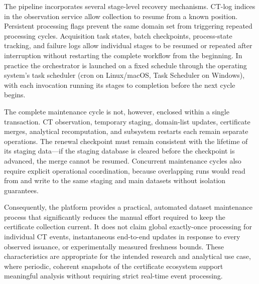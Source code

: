 The pipeline incorporates several stage-level recovery mechanisms. CT-log
indices in the observation service allow collection to resume from a known
position. Persistent processing flags prevent the same domain set from
triggering repeated processing cycles. Acquisition task states, batch
checkpoints, process-state tracking, and failure logs allow individual stages
to be resumed or repeated after interruption without restarting the complete
workflow from the beginning. In practice the orchestrator is launched on a
fixed schedule through the operating system's task scheduler (cron on
Linux/macOS, Task Scheduler on Windows), with each invocation running its
stages to completion before the next cycle begins.

The complete maintenance cycle is not, however, enclosed within a single
transaction. CT observation, temporary staging, domain-list updates,
certificate merges, analytical recomputation, and subsystem restarts each
remain separate operations. The renewal checkpoint must remain consistent
with the lifetime of its staging data---if the staging database is cleared
before the checkpoint is advanced, the merge cannot be resumed. Concurrent
maintenance cycles also require explicit operational coordination, because
overlapping runs would read from and write to the same staging and main
datasets without isolation guarantees.

Consequently, the platform provides a practical, automated dataset maintenance
process that significantly reduces the manual effort required to keep the
certificate collection current. It does not claim global exactly-once
processing for individual CT events, instantaneous end-to-end updates in
response to every observed issuance, or experimentally measured freshness
bounds. These characteristics are appropriate for the intended research and
analytical use case, where periodic, coherent snapshots of the certificate
ecosystem support meaningful analysis without requiring strict real-time
event processing.
